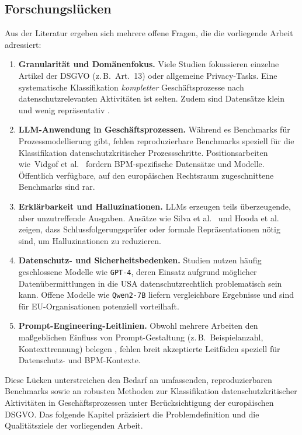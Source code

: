 \subsection*{Forschungslücken}

Aus der Literatur ergeben sich mehrere offene Fragen, die die vorliegende Arbeit adressiert:

\begin{enumerate}
    \item \textbf{Granularität und Domänenfokus.} Viele Studien fokussieren einzelne Artikel der \ac{DSGVO} (z.\,B.\ Art.~13) oder allgemeine Privacy-Tasks. Eine systematische Klassifikation \emph{kompletter} Geschäftsprozesse nach datenschutzrelevanten Aktivitäten ist selten. Zudem sind Datensätze klein und wenig repräsentativ \cite{nake2023towards}.
    \item \textbf{\ac{LLM}-Anwendung in Geschäftsprozessen.} Während es Benchmarks für Prozessmodellierung gibt, fehlen reproduzierbare Benchmarks speziell für die Klassifikation datenschutzkritischer Prozessschritte. Positionsarbeiten wie\linebreak~Vidgof et al.\ \cite{vidgof2023largelanguagemodelsbusiness} fordern \ac{BPM}-spezifische Datensätze und Modelle. Öffentlich verfügbare, auf den europäischen Rechtsraum zugeschnittene Benchmarks sind rar.
    \item \textbf{Erklärbarkeit und Halluzinationen.} \acp{LLM} erzeugen teils überzeugende, aber unzutreffende Ausgaben. Ansätze wie Silva et al.\ \cite{silva2024entailment} und Hooda et al.\ \cite{hooda2024policylr} zeigen, dass Schlussfolgerungsprüfer oder formale Repräsentationen nötig sind, um Halluzinationen zu reduzieren.
    \item \textbf{Datenschutz- und Sicherheitsbedenken.} Studien nutzen häufig geschlossene Modelle wie \texttt{GPT-4}, deren Einsatz aufgrund möglicher Datenübermittlungen in die USA datenschutzrechtlich problematisch sein kann. Offene Modelle wie \texttt{Qwen2-7B} liefern vergleichbare Ergebnisse \cite{schwerin2024systematic} und sind für \ac{EU}-Organisationen potenziell vorteilhaft.
    \item \textbf{Prompt-Engineering-Leitlinien.} Obwohl mehrere Arbeiten den maßgeblichen Einfluss von Prompt-Gestaltung (z.\,B.\ Beispielanzahl, Kontexttrennung) belegen \cite{liu2023prompting,pragyan2024toward}, fehlen breit akzeptierte Leitfäden speziell für Datenschutz- und \ac{BPM}-Kontexte.
\end{enumerate}

Diese Lücken unterstreichen den Bedarf an umfassenden, reproduzierbaren Benchmarks sowie an robusten Methoden zur Klassifikation datenschutzkritischer Aktivitäten in Geschäftsprozessen unter Berücksichtigung der europäischen \ac{DSGVO}. Das folgende Kapitel präzisiert die Problemdefinition und die Qualitätsziele der vorliegenden Arbeit.
